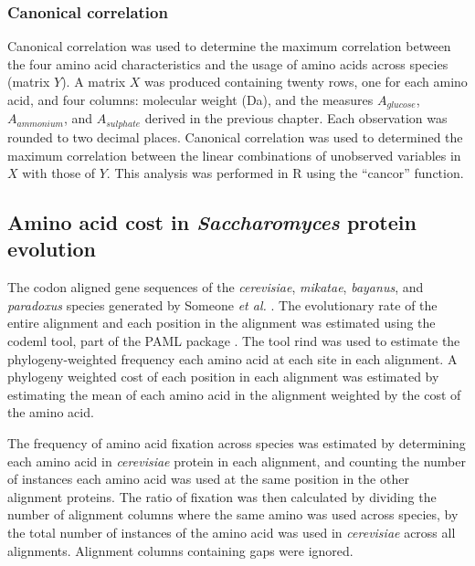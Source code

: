 
\subsubsection{Canonical correlation}

Canonical correlation was used to determine the maximum correlation between the four amino acid characteristics and the usage of amino acids across species (matrix $Y$). A matrix $X$ was produced containing twenty rows, one for each amino acid, and four columns: molecular weight (Da), and the measures $A_{glucose}$, $A_{ammonium}$, and $A_{sulphate}$ derived in the previous chapter. Each observation was rounded to two decimal places. Canonical correlation was used to determined the maximum correlation between the linear combinations of unobserved variables in $X$ with those of $Y$. This analysis was performed in R using the ``cancor'' function.


\subsection{Amino acid cost in \emph{Saccharomyces} protein evolution}

The codon aligned gene sequences of the \emph{cerevisiae}, \emph{mikatae}, \emph{bayanus}, and \emph{paradoxus} species generated by Someone \emph{et al.} \cite{wall2005}. The evolutionary rate of the entire alignment and each position in the alignment was estimated using the codeml tool, part of the PAML package \cite{yang2007}. The tool rind \cite{bruno1996} was used to estimate the phylogeny-weighted frequency each amino acid at each site in each alignment. A phylogeny weighted cost of each position in each alignment was estimated by estimating the mean of each amino acid in the alignment weighted by the cost of the amino acid.



The frequency of amino acid fixation across species was estimated by determining each amino acid in \emph{cerevisiae} protein in each alignment, and counting the number of instances each amino acid was used at the same position in the other alignment proteins. The ratio of fixation was then calculated by dividing the number of alignment columns where the same amino was used across species, by the total number of instances of the amino acid was used in \emph{cerevisiae} across all alignments. Alignment columns containing gaps were ignored.

